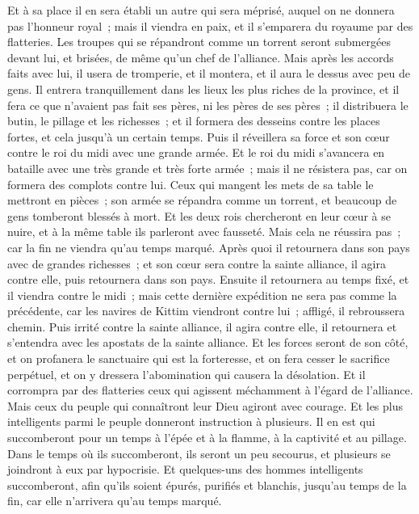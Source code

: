 \begin{multicols}{2}
Et à sa place il en sera établi un autre qui sera méprisé, auquel on ne donnera pas l'honneur royal~; mais il viendra en paix, et il s'emparera du royaume par des flatteries.
Les troupes qui se répandront comme un torrent seront submergées devant lui, et brisées, de même qu'un chef de l'alliance.
Mais après les accords faits avec lui, il usera de tromperie, et il montera, et il aura le dessus avec peu de gens.
Il entrera tranquillement dans les lieux les plus riches de la province, et il fera ce que n'avaient pas fait ses pères, ni les pères de ses pères~; il distribuera le butin, le pillage et les richesses~; et il formera des desseins contre les places fortes, et cela jusqu'à un certain temps.
Puis il réveillera sa force et son cœur contre le roi du midi avec une grande armée. Et le roi du midi s'avancera en bataille avec une très grande et très forte armée~; mais il ne résistera pas, car on formera des complots contre lui.
Ceux qui mangent les mets de sa table le mettront en pièces~; son armée se répandra comme un torrent, et beaucoup de gens tomberont blessés à mort.
Et les deux rois chercheront en leur cœur à se nuire, et à la même table ils parleront avec fausseté. Mais cela ne réussira pas~; car la fin ne viendra qu'au temps marqué.
Après quoi il retournera dans son pays avec de grandes richesses~; et son cœur sera contre la sainte alliance, il agira contre elle, puis retournera dans son pays.
Ensuite il retournera au temps fixé, et il viendra contre le midi~; mais cette dernière expédition ne sera pas comme la précédente,
car les navires de Kittim viendront contre lui~; affligé, il rebroussera chemin. Puis irrité contre la sainte alliance, il agira contre elle, il retournera et s'entendra avec les apostats de la sainte alliance.
Et les forces seront de son côté, et on profanera le sanctuaire qui est la forteresse, et on fera cesser le sacrifice perpétuel, et on y dressera l'abomination qui causera la désolation.
Et il corrompra par des flatteries ceux qui agissent méchamment à l'égard de l'alliance. Mais ceux du peuple qui connaîtront leur Dieu agiront avec courage.
Et les plus intelligents parmi le peuple donneront instruction à plusieurs. Il en est qui succomberont pour un temps à l'épée et à la flamme, à la captivité et au pillage.
Dans le temps où ils succomberont, ils seront un peu secourus, et plusieurs se joindront à eux par hypocrisie.
Et quelques-uns des hommes intelligents succomberont, afin qu'ils soient épurés, purifiés et blanchis, jusqu'au temps de la fin, car elle n'arrivera qu'au temps marqué.

\end{multicols}
